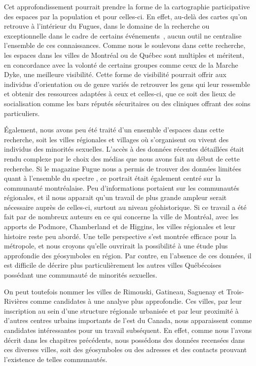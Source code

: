 Cet approfondissement pourrait prendre la forme de la cartographie participative des espaces \lgbt{} par la population et pour celles-ci.
En effet, au-delà des cartes qu'on retrouve à l'intérieur du Fugues, dans le domaine de la recherche  ou exceptionnelle dans le cadre de certains événements~\parencite{Pervers/Cite2015}, aucun outil ne centralise l'ensemble de ces connaissances.
Comme nous le soulevons dans cette recherche, les espaces \lgbt{} dans les villes de Montréal ou de Québec sont multiples et méritent, en concordance avec la volonté de certains groupes comme ceux de la Marche Dyke, une meilleure visibilité.
Cette forme de visibilité pourrait offrir aux individus d'orientation ou de genre variés de retrouver les gens qui leur ressemble et obtenir des ressources adaptées à ceux et celles-ci, que ce soit des lieux de socialisation comme les bars réputés sécuritaires ou des cliniques offrant des soins particuliers.

Également, nous avons peu été traité d'un ensemble d'espaces dans cette recherche, soit les villes régionales et villages où s'organisent ou vivent des individus des minorités sexuelles.
L'accès à des données récentes détaillées était rendu complexe par le choix des médias que nous avons fait au début de cette recherche.
Si le magazine Fugue nous a permis de trouver des données limitées quant à l'ensemble du spectre \lgbt, ce portrait était également centré sur la communauté montréalaise.
Peu d'informations portaient sur les communautés régionales, et il nous apparait qu'un travail de plus grande ampleur serait nécessaire auprès de celles-ci, surtout au niveau géohistorique.
Si ce travail a été fait par de nombreux auteurs en ce qui concerne la ville de Montréal, avec les apports de Podmore, Chamberland et de Higgins, les villes régionales et leur histoire reste peu abordé.
Une telle perspective s'est montrée efficace pour la métropole, et nous croyons qu'elle ouvrirait la possibilité à une étude plus approfondie des géosymboles en région. 
Par contre, en l'absence de ces données, il est difficile de décrire plus particulièrement les autres villes Québécoises possédant une communauté de minorités sexuelles.

On peut toutefois nommer les villes de Rimouski, Gatineau, Saguenay et Trois-Rivières comme candidates à une analyse plus approfondie.
Ces villes, par leur inscription au sein d'une structure régionale urbanisée et par leur proximité à d'autres centres urbains importants de l'est du Canada, nous apparaissent comme candidates intéressantes pour un travail subséquent.
En effet, comme nous l'avons décrit dans les chapitres précédents, nous possédons des données recensées dans ces diverses villes, soit des géosymboles ou des adresses et des contacts prouvant l'existence de telles communautés.

